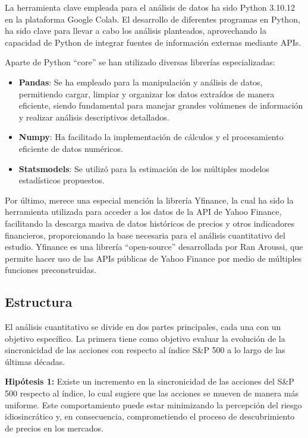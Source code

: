 \documentclass[12pt,a4paper]{article}
\begin{document}
La herramienta clave empleada para el análisis de datos ha sido Python 3.10.12 en la plataforma Google Colab. El desarrollo de diferentes programas en Python, ha sido clave para llevar a cabo los análisis planteados, aprovechando la capacidad de Python de integrar fuentes de información externas mediante APIs.

Aparte de Python ``core'' se han utilizado diversas librerías especializadas:

\begin{itemize}
\item \textbf{Pandas}: Se ha empleado para la manipulación y análisis de datos, permitiendo cargar, limpiar y organizar los datos extraídos de manera eficiente, siendo fundamental para manejar grandes volúmenes de información y realizar análisis descriptivos detallados.
\item \textbf{Numpy}: Ha facilitado la implementación de cálculos y el procesamiento eficiente de datos numéricos.
\item \textbf{Statsmodels}: Se utilizó para la estimación de los múltiples modelos estadísticos propuestos.
\end{itemize}

Por último, merece una especial mención la librería Yfinance, la cual ha sido la herramienta utilizada para acceder a los datos de la API de Yahoo Finance, facilitando la descarga masiva de datos históricos de precios y otros indicadores financieros, proporcionando la base necesaria para el análisis cuantitativo del estudio. Yfinance es una librería ``open-source'' desarrollada por Ran Aroussi, que permite hacer uso de las APIs públicas de Yahoo Finance por medio de múltiples funciones preconstruidas.

\subsection*{Estructura}

El análisis cuantitativo se divide en dos partes principales, cada una con un objetivo específico. La primera tiene como objetivo evaluar la evolución de la sincronicidad de las acciones con respecto al índice S\&P 500 a lo largo de las últimas décadas.

\textbf{Hipótesis 1:} Existe un incremento en la sincronicidad de las acciones del S\&P 500 respecto al índice, lo cual sugiere que las acciones se mueven de manera más uniforme. Este comportamiento puede estar minimizando la percepción del riesgo idiosincrático y, en consecuencia, comprometiendo el proceso de descubrimiento de precios en los mercados.
\end{document}
